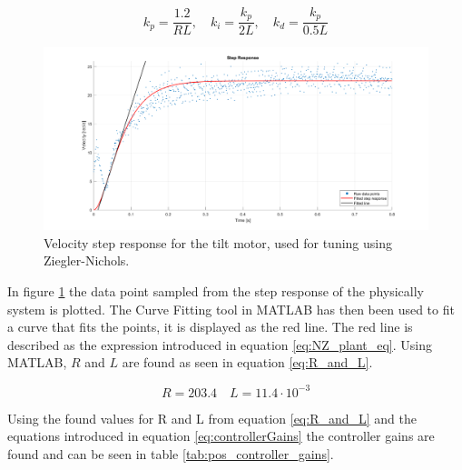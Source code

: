 \documentclass[../../main.tex]{subfiles}
\begin{document}
\begin{equation}
k_p = \frac{1.2}{RL}, \quad k_i = \frac{k_p}{2L}, \quad k_d = \frac{k_p}{0.5L}
\label{eq:controllerGains}
\end{equation}

\begin{figure}
    \centering
    \includegraphics[width = 1\textwidth]{Sections/System_Design/Images/Ziegler-Nichols_Stepresponse.png}
    \caption{Velocity step response for the tilt motor, used for tuning using Ziegler-Nichols.}
    \label{fig:stepPlantNZ}
\end{figure}

In figure \ref{fig:stepPlantNZ} the data point sampled from the step response of the physically  system is plotted. The Curve Fitting tool in MATLAB has then been used to fit a curve that fits the points, it is displayed as the red line. The red line is described as the expression introduced in equation \ref{eq:NZ_plant_eq}. Using MATLAB, $R$ and $L$ are found as seen in equation \ref{eq:R_and_L}.

\begin{equation}
    R = 203.4 \quad L = 11.4 \cdot 10^{-3} 
    \label{eq:R_and_L}
\end{equation}

Using the found values for R and L from equation \ref{eq:R_and_L} and the equations introduced in equation \ref{eq:controllerGains} the controller gains are found and can be seen in table \ref{tab:pos_controller_gains}.

\end{document}
